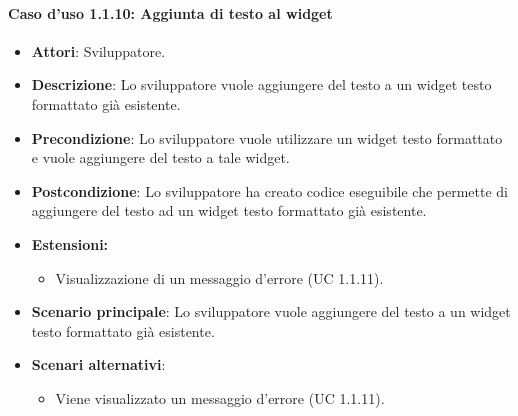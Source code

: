 \paragraph{Caso d'uso 1.1.10: Aggiunta di testo al widget}
\begin{itemize}
\item\textbf{Attori}: Sviluppatore.
\item\textbf{Descrizione}: Lo sviluppatore vuole aggiungere del testo a un widget testo formattato già esistente.
\item\textbf{Precondizione}: Lo sviluppatore vuole utilizzare un widget testo formattato e vuole aggiungere del testo a tale widget.
\item\textbf{Postcondizione}: Lo sviluppatore ha creato codice eseguibile che permette di aggiungere del testo ad un widget testo formattato già esistente.
\item\textbf{Estensioni:}
	\begin{itemize}
		\item Visualizzazione di un messaggio d'errore (UC 1.1.11).
		\end{itemize}
\item\textbf{Scenario principale}: Lo sviluppatore vuole aggiungere del testo a un widget testo formattato già esistente.
\item\textbf{Scenari alternativi}: 
	\begin{itemize}
	\item Viene visualizzato un messaggio d'errore (UC 1.1.11).
	\end{itemize}
\end{itemize}